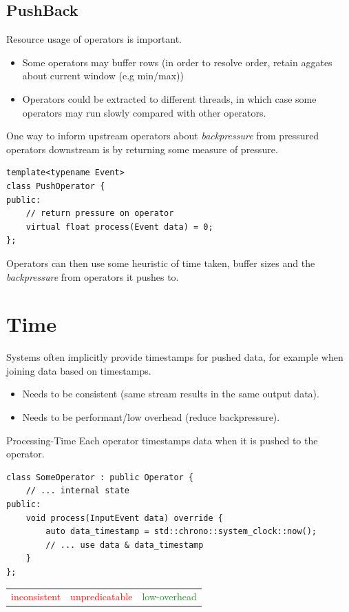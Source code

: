 \subsection{PushBack}
Resource usage of operators is important.
\begin{itemize}
    \item Some operators may buffer rows (in order to resolve order, retain aggates about current window (e.g min/max))
    \item Operators could be extracted to different threads, in which case some operators may run slowly compared with other operators.
\end{itemize}
One way to inform upstream operators about \textit{backpressure} from pressured operators downstream is by returning some measure of pressure.
\begin{verbatim}
template<typename Event>
class PushOperator {
public:
    // return pressure on operator
    virtual float process(Event data) = 0;
};
\end{verbatim}
Operators can then use some heuristic of time taken, buffer sizes and the \textit{backpressure} from operators it pushes to.

\section{Time}
Systems often implicitly provide timestamps for pushed data, for example when joining data based on timestamps.
\begin{itemize}
    \item Needs to be consistent (same stream results in the same output data).
    \item Needs to be performant/low overhead (reduce backpressure).
\end{itemize}

\begin{definitionbox}{Processing-Time}
    Each operator timestamps data when it is pushed to the operator.
    \begin{verbatim}
class SomeOperator : public Operator {
    // ... internal state
public:
    void process(InputEvent data) override {
        auto data_timestamp = std::chrono::system_clock::now();
        // ... use data & data_timestamp
    }
};
    \end{verbatim}
    \begin{center}
        \begin{tabular}{c | c | c}
            \textcolor{red}{inconsistent} & \textcolor{red}{unpredicatable} & \textcolor{ForestGreen}{low-overhead} \\
        \end{tabular}
    \end{center}
\end{definitionbox}

